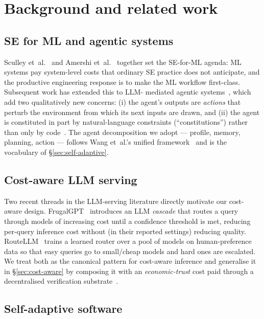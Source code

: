 \documentclass[11pt,a4paper]{article}
\begin{document}
\section{Background and related work}\label{sec:background}

\subsection{SE for ML and agentic systems}\label{sec:bg:se-ml}

Sculley et~al.~\cite{sculley2015hidden} and
Amershi et~al.~\cite{amershi2019software} together set the SE-for-ML
agenda: ML systems pay system-level costs that ordinary SE practice does
not anticipate, and the productive engineering response is to make the
ML workflow first-class. Subsequent work has extended this to LLM-
mediated agentic systems~\cite{wang2024survey}, which add two
qualitatively new concerns: (i) the agent's outputs are \emph{actions}
that perturb the environment from which its next inputs are drawn, and
(ii) the agent is constituted in part by natural-language constraints
(``constitutions'') rather than only by code~\cite{bai2022constitutional}.
The agent decomposition we adopt --- profile, memory, planning, action ---
follows Wang et~al.'s unified
framework~\cite{wang2024survey} and is the vocabulary of
\S\ref{sec:self-adaptive}.

\subsection{Cost-aware LLM serving}\label{sec:bg:cost}

Two recent threads in the LLM-serving literature directly motivate our
cost-aware design. FrugalGPT~\cite{chen2023frugalgpt} introduces an LLM
\emph{cascade} that routes a query through models of increasing cost
until a confidence threshold is met, reducing per-query inference cost
without (in their reported settings) reducing quality. RouteLLM~\cite{ong2024routellm}
trains a learned router over a pool of models on human-preference data so
that easy queries go to small/cheap models and hard ones are escalated.
We treat both as the canonical pattern for cost-aware inference and
generalise it in \S\ref{sec:cost-aware} by composing it with an
\emph{economic-trust} cost paid through a decentralised verification
substrate~\cite{rao2021bittensor,steeves2022incentivizing,opentensor2024yuma,conway2024opml,ganescu2024trust}.

\subsection{Self-adaptive software}\label{sec:bg:self-adaptive}
\end{document}
